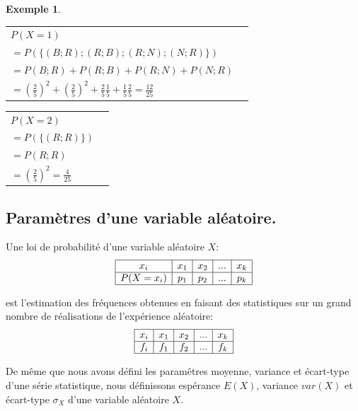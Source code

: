 \documentclass[a4paper,11pt]{article}
\theoremstyle{break}
\newcounter{enonce}
\newtheorem{exemple}[enonce]{Exemple}
\begin{document}
\begin{exemple}
\begin{multicols}{2}
\begin{tabular}{ll}
    $P(X=1)$\\
    $=P(\lbrace(B;R);(R;B);(R;N);(N;R)\rbrace)$ \\
    $=P(B;R)+P(R;B)+P(R;N)+P(N;R)$\\
    $=(\frac{2}{5})^2+(\frac{2}{5})^2+\frac{2}{5}\frac{1}{5}+\frac{1}{5}\frac{2}{5}=\frac{12}{25}$\\
    \end{tabular} 
    
\begin{tabular}{ll}
    $P(X=2)$\\
    $=P(\lbrace(R;R)\rbrace)$ \\
    $=P(R;R)$\\
    $=(\frac{2}{5})^2=\frac{4}{25}$\\
    \end{tabular} 


  
 
\end{multicols}
\end{exemple}

\subsection{Paramètres d'une variable aléatoire.}
               
Une loi de probabilité d'une variable aléatoire $X$:
 $$
\begin{array}{|c|c|c|c|c|}

\hline
    x_i&x_1&x_2&...&x_k\\
    \hline
    P(X=x_i)&p_1&p_2&...&p_k\\
    \hline
    \end{array} 
$$ 

est l'estimation des fréquences obtenues en faisant des statistiques sur un grand
nombre de réalisations de l'expérience aléatoire:
 $$
\begin{array}{|c|c|c|c|c|}

\hline
    x_i&x_1&x_2&...&x_k\\
    \hline
    f_i&f_1&f_2&...&f_k\\
    \hline
    \end{array} 
$$ 
 
De même que nous avons défini les paramêtres moyenne, variance et écart-type d'une série statistique, 
nous définissons espérance $E(X)$, variance $var(X)$ et écart-type $\sigma_X$ d'une variable aléatoire $X$.
\end{document}
